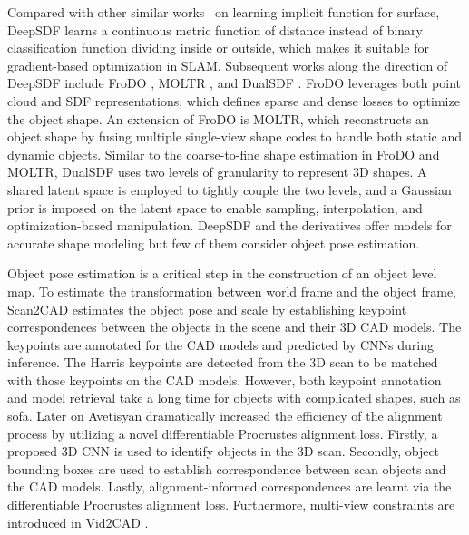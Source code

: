 Compared with other similar works~\cite{Mescheder_2019_CVPR, Chen_2019_CVPR} on learning implicit function for surface, DeepSDF \cite{park2019deepsdf} learns a continuous metric function of distance instead of binary classification function dividing inside or outside, which makes it suitable for gradient-based optimization in SLAM. 
Subsequent works along the direction of DeepSDF include FroDO \cite{runz2020frodo}, MOLTR \cite{li2020mo}, and DualSDF \cite{hao2020dualsdf}. 
FroDO leverages both point cloud and SDF representations, which defines sparse and dense losses to optimize the object shape. 
An extension of FroDO is MOLTR, which reconstructs an object shape by fusing multiple single-view shape codes to handle both static and dynamic objects. 
Similar to the coarse-to-fine shape estimation in FroDO and MOLTR, DualSDF uses two levels of granularity to represent 3D shapes. A shared latent space is employed to tightly couple the two levels, and a Gaussian prior is imposed on the latent space to enable sampling, interpolation, and optimization-based manipulation.  
DeepSDF and the derivatives offer models for accurate shape modeling but few of them consider object pose estimation. 

Object pose estimation is a critical step in the construction of an object level map. 
To estimate the transformation between world frame and the object frame, Scan2CAD \cite{avetisyan2019scan2cad} estimates the object pose and scale by establishing keypoint correspondences between the objects in the scene and their 3D CAD models. The keypoints are annotated for the CAD models and predicted by CNNs during inference. The Harris keypoints are detected from the 3D scan to be matched with those keypoints on the CAD models. However, both keypoint annotation and model retrieval take a long time for objects with complicated shapes, such as sofa. Later on Avetisyan \etal\cite{avetisyan2019end} dramatically increased the efficiency of the alignment process by utilizing a novel differentiable Procrustes alignment loss. Firstly, a proposed 3D CNN is used to identify objects in the 3D scan. Secondly, object bounding boxes are used to establish correspondence between scan objects and the CAD models. Lastly, alignment-informed correspondences are learnt via the differentiable Procrustes alignment loss.
Furthermore, multi-view constraints are introduced in Vid2CAD \cite{maninis2020vid2cad}. 

